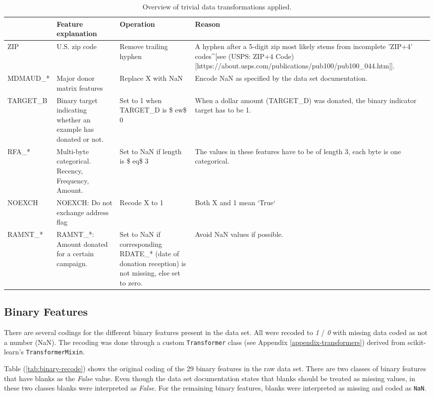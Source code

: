 \documentclass[
  11pt,
  a4paper,
  DIV=12,captions=tableheading,oneside]{scrbook}
\begin{document}
\begin{table}[!h]

\caption{\label{tab:sanitize}Overview of trivial data transformations applied.}
\centering
\begin{tabular}{l>{\raggedright\arraybackslash}p{4cm}>{\raggedright\arraybackslash}p{4cm}>{\raggedright\arraybackslash}p{4cm}}
\toprule
  & Feature explanation & Operation & Reason\\
\midrule
ZIP & U.S. zip code & Remove trailing hyphen & A hyphen after a 5-digit zip most likely stems from incomplete 'ZIP+4' codes\textasciicircum{}[see (USPS: ZIP+4 Code)[https://about.usps.com/publications/pub100/pub100\_044.htm]].\\
MDMAUD\_* & Major donor matrix features & Replace X with NaN & Encode NaN as specified by the data set documentation.\\
TARGET\_B & Binary target indicating whether an example has donated or not. & Set to 1 when TARGET\_D is \$
ew\$ 0 & When a dollar amount (TARGET\_D) was donated, the binary indicator target has to be 1.\\
RFA\_* & Multi-byte categorical. Recency, Frequency, Amount. & Set to NaN if length is \$
eq\$ 3 & The values in these features have to be of length 3, each byte is one categorical.\\
NOEXCH & NOEXCH: Do not exchange address flag & Recode X to 1 & Both X and 1 mean `True`\\
\addlinespace
RAMNT\_* & RAMNT\_*: Amount donated for a certain campaign. & Set to NaN if corresponding RDATE\_* (date of donation reception) is not missing, else set to zero. & Avoid NaN values if possible.\\
\bottomrule
\end{tabular}
\end{table}

\hypertarget{binary-features}{%
\subsection{Binary Features}\label{binary-features}}

There are several codings for the different binary features present in the data set. All were recoded to \emph{1} / \emph{0} with missing data coded as not a number (NaN). The recoding was done through a custom \texttt{Transformer} class (see Appendix \ref{appendix-transformers}) derived from scikit-learn's \texttt{TransformerMixin}.

Table (\ref{tab:binary-recode}) shows the original coding of the 29 binary features in the raw data set. There are two classes of binary features that have blanks as the \emph{False} value. Even though the data set documentation states that blanks should be treated as missing values, in these two classes blanks were interpreted as \emph{False}. For the remaining binary features, blanks were interpreted as missing and coded as \texttt{NaN}.
\end{document}

